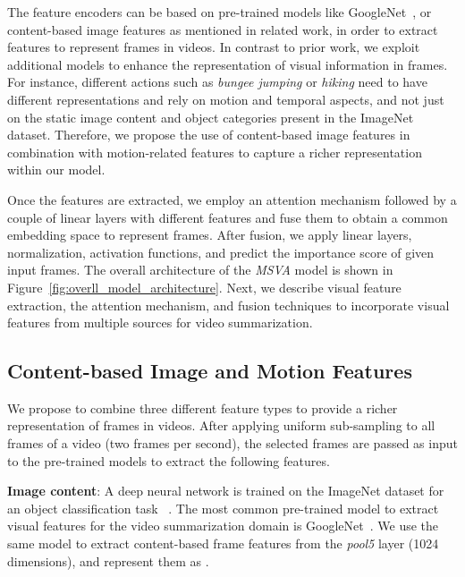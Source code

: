 \documentclass{article}
\begin{document}
The feature encoders can be based on pre-trained models like GoogleNet~\cite{DBLP:conf/cvpr/SzegedyLJSRAEVR15}, or content-based image features as mentioned in related work, in order to extract features to represent frames in videos. In contrast to prior work, we exploit additional models to enhance the representation of visual information in frames. For instance, different actions such as \textit{bungee jumping} or \textit{hiking} need to have different representations and rely on motion and temporal aspects, and not just on the static image content and object categories present in the ImageNet dataset. Therefore, we propose the use of content-based image features in combination with motion-related features to capture a richer representation within our model.

Once the features are extracted, we employ an attention mechanism followed by a couple of linear layers with different features and fuse them to obtain a common embedding space to represent frames. After fusion, we apply linear layers, normalization, activation functions, and predict the importance score of given input frames. The overall architecture of the \textit{MSVA} model is shown in Figure~\ref{fig:overll_model_architecture}. Next, we describe visual feature extraction, the attention mechanism, and fusion techniques to incorporate visual features from multiple sources for video summarization.

\subsection{Content-based Image and Motion Features}

																																																																																																																			  
We propose to combine three different feature types to provide a richer representation of frames in videos. After applying uniform sub-sampling to all frames of a video (two frames per second), the selected frames are passed as input to the pre-trained models to extract the following features.

\noindent
\textbf{Image content}: A deep neural network is trained on the ImageNet dataset for an object classification task ~\cite{DBLP:conf/cvpr/SzegedyLJSRAEVR15}. The most common pre-trained model to extract visual features for the video summarization domain is GoogleNet~\cite{DBLP:conf/cvpr/SzegedyLJSRAEVR15}. We use the same model to extract content-based frame features from the \textit{pool5} layer (\num{1024} dimensions), and represent them as .
\end{document}
